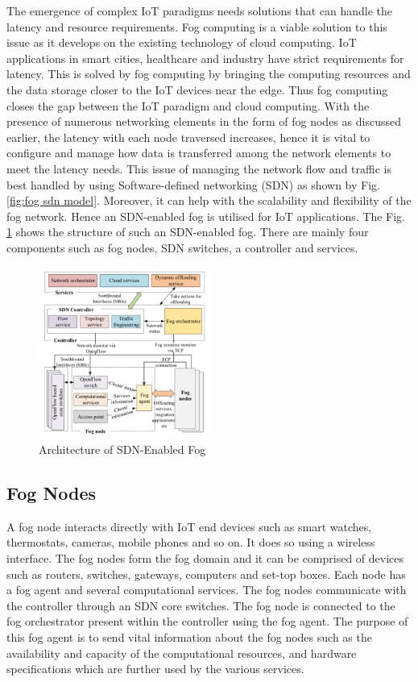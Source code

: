\documentclass[conference]{IEEEtran}
\begin{document}
The emergence of complex IoT paradigms needs solutions that can handle the latency and resource requirements. Fog computing is a viable solution to this issue as it develops on the existing technology of cloud computing. IoT applications in smart cities, healthcare and industry have strict requirements for latency. This is solved by fog computing by bringing the computing resources and the data storage closer to the IoT devices near the edge. Thus fog computing closes the gap between the IoT paradigm and cloud computing. With the presence of numerous networking elements in the form of fog nodes as discussed earlier, the latency with each node traversed increases, hence it is vital to configure and manage how data is transferred among the network elements to meet the latency needs\cite{herr}. This issue of managing the network flow and traffic is best handled by using Software-defined networking (SDN) as shown by Fig. \ref{fig:fog sdn model}. Moreover, it can help with the scalability and flexibility of the fog network. Hence an SDN-enabled fog is utilised for IoT applications. The Fig. \ref{fig:fog sdn arch} shows the structure of such an SDN-enabled fog. There are mainly four components such as fog nodes, SDN switches, a controller and services.


\begin{figure}[h]
    \centering
    \includegraphics[width=0.5\textwidth]{Images/FOG SDN ARCH.png}
    \caption{Architecture of SDN-Enabled Fog}
    \label{fig:fog sdn arch}
\end{figure}
\subsection{Fog Nodes}
A fog node interacts directly with IoT end devices such as smart watches, thermostats, cameras, mobile phones and so on. It does so using a wireless interface. The fog nodes form the fog domain and it can be comprised of devices such as routers, switches, gateways, computers and set-top boxes\cite{moura}. Each node has a fog agent and several computational services\cite{phan}. The fog nodes communicate with the controller through an SDN core switches. The fog node is connected to the fog orchestrator present within the controller using the fog agent. The purpose of this fog agent is to send vital information about the fog nodes such as the availability and capacity of the computational resources, and hardware specifications which are further used by the various services.
\end{document}
